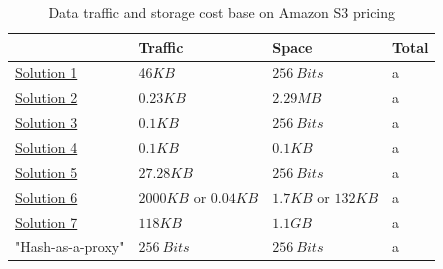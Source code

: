 \documentclass[12pt]{article}
\begin{document}
\begin{savenotes}
\begin{table}[!htpb]
\centering
\addtolength{\tabcolsep}{3pt}
\begin{tabular}{|L{4cm}|L{3.5cm}|L{3.5cm}|L{3.5cm}|}
\hline
&Traffic&Space&Total \\
\hline
\hyperref[sub:Soltuion1]{Solution 1}&4$6KB$&$256\ Bits$&a\\
\hline
\hyperref[sub:Soltuion2]{Solution 2}&$0.23 KB$&$2.29 MB$&a\\
\hline
\hyperref[sub:Soltuion3]{Solution 3}&$0.1 KB$&$256\ Bits$&a\\
\hline
\hyperref[sub:Soltuion4]{Solution 4}&$0.1 KB$&$0.1 KB$&a\\
\hline
\hyperref[sub:Soltuion5]{Solution 5}&$27.28 KB$&$256\ Bits$&a\\
\hline
\hyperref[sub:Soltuion6]{Solution 6}&$2000 KB$ or $0.04KB$ &$1.7 KB$ or $132 KB$&a\\
\hline
\hyperref[sub:Soltuion7]{Solution 7}&$118 KB$& $1.1 GB$&a\\
\hline
"Hash-as-a-proxy"&$256\ Bits $&$256\ Bits$&a\\

\hline



\end{tabular}
\caption{Data traffic and storage cost base on Amazon S3 pricing}
\label{table:asymptoticAnal}
\end{table}
\end{savenotes}
\end{document}
